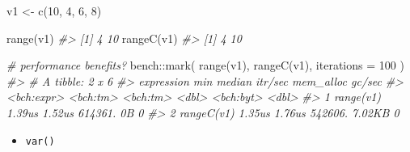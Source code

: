 \documentclass[
]{book}
\newenvironment{Shaded}{\begin{snugshade}}{\end{snugshade}}
\newcommand{\AttributeTok}[1]{\textcolor[rgb]{0.77,0.63,0.00}{#1}}
\newcommand{\CommentTok}[1]{\textcolor[rgb]{0.56,0.35,0.01}{\textit{#1}}}
\newcommand{\DecValTok}[1]{\textcolor[rgb]{0.00,0.00,0.81}{#1}}
\newcommand{\FunctionTok}[1]{\textcolor[rgb]{0.00,0.00,0.00}{#1}}
\newcommand{\NormalTok}[1]{#1}
\newcommand{\OtherTok}[1]{\textcolor[rgb]{0.56,0.35,0.01}{#1}}
\newcommand{\SpecialCharTok}[1]{\textcolor[rgb]{0.00,0.00,0.00}{#1}}
\providecommand{\tightlist}{%
  \setlength{\itemsep}{0pt}\setlength{\parskip}{0pt}}
\begin{document}
\begin{Shaded}
\begin{Highlighting}[]
\NormalTok{v1 }\OtherTok{\textless{}{-}} \FunctionTok{c}\NormalTok{(}\DecValTok{10}\NormalTok{, }\DecValTok{4}\NormalTok{, }\DecValTok{6}\NormalTok{, }\DecValTok{8}\NormalTok{)}

\FunctionTok{range}\NormalTok{(v1)}
\CommentTok{\#\textgreater{} [1]  4 10}
\FunctionTok{rangeC}\NormalTok{(v1)}
\CommentTok{\#\textgreater{} [1]  4 10}

\CommentTok{\# performance benefits?}
\NormalTok{bench}\SpecialCharTok{::}\FunctionTok{mark}\NormalTok{(}
  \FunctionTok{range}\NormalTok{(v1),}
  \FunctionTok{rangeC}\NormalTok{(v1),}
  \AttributeTok{iterations =} \DecValTok{100}
\NormalTok{)}
\CommentTok{\#\textgreater{} \# A tibble: 2 x 6}
\CommentTok{\#\textgreater{}   expression      min   median \textasciigrave{}itr/sec\textasciigrave{} mem\_alloc \textasciigrave{}gc/sec\textasciigrave{}}
\CommentTok{\#\textgreater{}   \textless{}bch:expr\textgreater{} \textless{}bch:tm\textgreater{} \textless{}bch:tm\textgreater{}     \textless{}dbl\textgreater{} \textless{}bch:byt\textgreater{}    \textless{}dbl\textgreater{}}
\CommentTok{\#\textgreater{} 1 range(v1)    1.39us   1.52us   614361.        0B        0}
\CommentTok{\#\textgreater{} 2 rangeC(v1)   1.35us   1.76us   542606.    7.02KB        0}
\end{Highlighting}
\end{Shaded}

\begin{itemize}
\tightlist
\item
  \texttt{var()}
\end{itemize}
\end{document}
